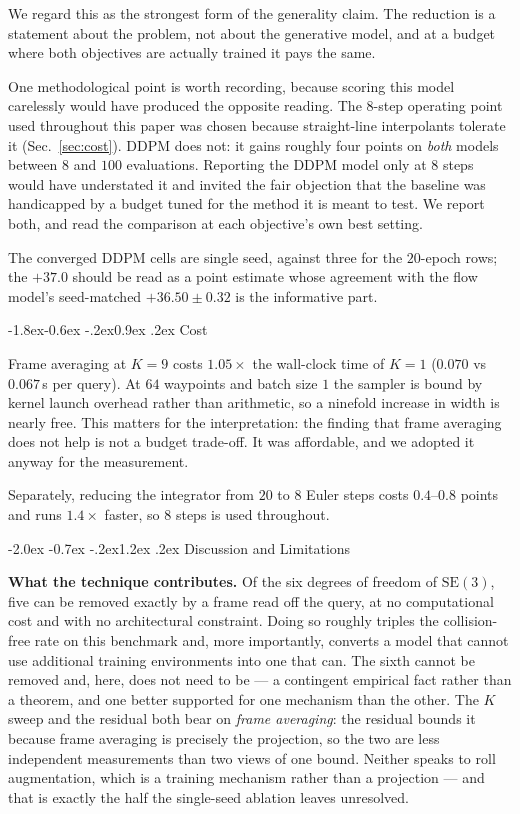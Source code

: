 \documentclass[10pt,twocolumn,letterpaper]{article}
\makeatletter
\renewcommand\section{\@startsection{section}{1}{\z@}%
  {-2.0ex \@plus -0.7ex \@minus -.2ex}{1.2ex \@plus.2ex}%
  {\centering\normalfont\large\bfseries}}
\renewcommand\subsection{\@startsection{subsection}{2}{\z@}%
  {-1.8ex\@plus -0.6ex \@minus -.2ex}{0.9ex \@plus .2ex}%
  {\normalfont\normalsize\bfseries}}
\theoremstyle{plain}
\newcommand{\SE}{\mathrm{SE}(3)}
\makeatother
\begin{document}
We regard this as the strongest form of the generality claim. The reduction is a
statement about the problem, not about the generative model, and at a budget
where both objectives are actually trained it pays the same.

One methodological point is worth recording, because scoring this model carelessly
would have produced the opposite reading. The $8$-step operating point used
throughout this paper was chosen because straight-line interpolants tolerate it
(Sec.~\ref{sec:cost}). DDPM does not: it gains roughly four points on
\emph{both} models between $8$ and $100$ evaluations. Reporting the DDPM model only
at $8$ steps would have understated it and invited the fair objection that the
baseline was handicapped by a budget tuned for the method it is meant to test.
We report both, and read the comparison at each objective's own best setting.

The converged DDPM cells are single seed, against three for the $20$-epoch rows;
the $+37.0$ should be read as a point estimate whose agreement with the flow
model's seed-matched $+36.50\pm0.32$ is the informative part.

\subsection{Cost}
\label{sec:cost}

Frame averaging at $K{=}9$ costs $1.05\times$ the wall-clock time of $K{=}1$
($0.070$ vs $0.067$\,s per query). At $64$ waypoints and batch size $1$ the sampler
is bound by kernel launch overhead rather than arithmetic, so a ninefold increase
in width is nearly free. This matters for the interpretation: the finding that
frame averaging does not help is not a budget trade-off. It was affordable, and we
adopted it anyway for the measurement.

Separately, reducing the integrator from $20$ to $8$ Euler steps costs $0.4$--$0.8$
points and runs $1.4\times$ faster, so $8$ steps is used throughout.

\section{Discussion and Limitations}
\label{sec:limits}

\textbf{What the technique contributes.} Of the six degrees of freedom of $\SE$,
five can be removed exactly by a frame read off the query, at no computational
cost and with no architectural constraint. Doing so roughly triples the
collision-free rate on this benchmark and, more importantly, converts a model that
cannot use additional training environments into one that can. The sixth cannot be
removed and, here, does not need to be --- a contingent empirical fact rather than
a theorem, and one better supported for one mechanism than the other. The $K$
sweep and the residual both bear on \emph{frame averaging}: the residual bounds
it because frame averaging is precisely the projection, so the two are less
independent measurements than two views of one bound. Neither speaks to roll
augmentation, which is a training mechanism rather than a projection --- and that
is exactly the half the single-seed ablation leaves unresolved.
\end{document}

